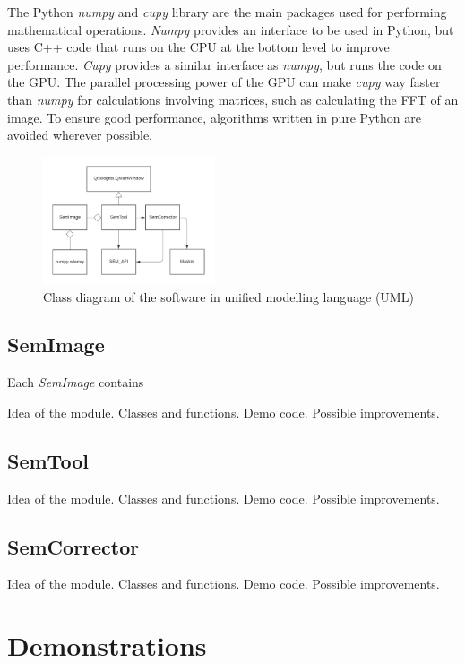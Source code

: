 \documentclass[conference]{IEEEtran}
\begin{document}
The Python \textit{numpy} and \textit{cupy} library are the main packages used for performing mathematical operations. \textit{Numpy} provides an interface to be used in Python, but uses C++ code that runs on the CPU at the bottom level to improve performance. \textit{Cupy} provides a similar interface as \textit{numpy}, but runs the code on the GPU. The parallel processing power of the GPU can make \textit{cupy} way faster than \textit{numpy} for calculations involving matrices, such as calculating the FFT of an image. To ensure good performance, algorithms written in pure Python are avoided wherever possible.

\begin{figure}[htbp]
    \centering
    \includegraphics[width=0.45\textwidth]{Images/Software classes.png}
    \caption{Class diagram of the software in unified modelling language (UML)}
    \label{Software classes}
\end{figure}

\subsection{SemImage}
Each \textit{SemImage} contains 

Idea of the module.
Classes and functions.
Demo code.
Possible improvements.

\subsection{SemTool}
Idea of the module.
Classes and functions.
Demo code.
Possible improvements.

\subsection{SemCorrector}
Idea of the module.
Classes and functions.
Demo code.
Possible improvements.

\section{Demonstrations}
\end{document}
